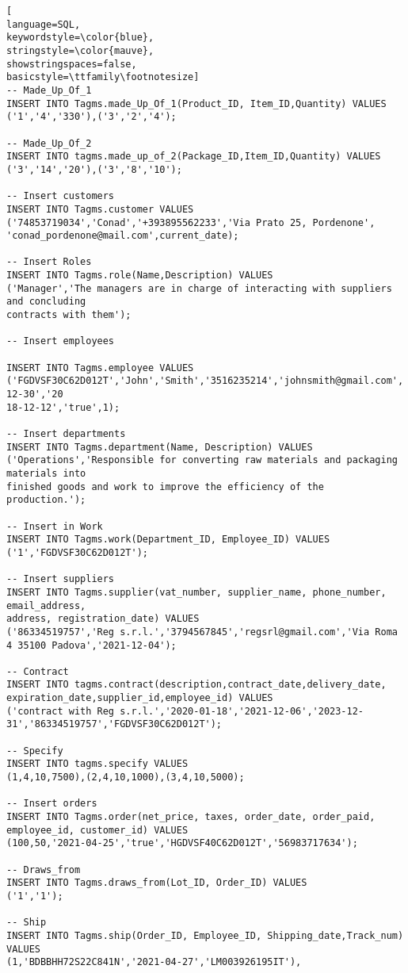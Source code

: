 \begin{lstlisting}[
language=SQL,
keywordstyle=\color{blue},
stringstyle=\color{mauve},
showstringspaces=false,
basicstyle=\ttfamily\footnotesize]
-- Made_Up_Of_1
INSERT INTO Tagms.made_Up_Of_1(Product_ID, Item_ID,Quantity) VALUES
('1','4','330'),('3','2','4');

-- Made_Up_Of_2
INSERT INTO tagms.made_up_of_2(Package_ID,Item_ID,Quantity) VALUES 
('3','14','20'),('3','8','10');

-- Insert customers
INSERT INTO Tagms.customer VALUES
('74853719034','Conad','+393895562233','Via Prato 25, Pordenone',
'conad_pordenone@mail.com',current_date);

-- Insert Roles
INSERT INTO Tagms.role(Name,Description) VALUES 
('Manager','The managers are in charge of interacting with suppliers and concluding 
contracts with them');

-- Insert employees

INSERT INTO Tagms.employee VALUES
('FGDVSF30C62D012T','John','Smith','3516235214','johnsmith@gmail.com','1995-12-30','20
18-12-12','true',1);

-- Insert departments
INSERT INTO Tagms.department(Name, Description) VALUES 
('Operations','Responsible for converting raw materials and packaging materials into 
finished goods and work to improve the efficiency of the production.');

-- Insert in Work
INSERT INTO Tagms.work(Department_ID, Employee_ID) VALUES ('1','FGDVSF30C62D012T');

-- Insert suppliers
INSERT INTO Tagms.supplier(vat_number, supplier_name, phone_number, email_address, 
address, registration_date) VALUES  
('86334519757','Reg s.r.l.','3794567845','regsrl@gmail.com','Via Roma 4 35100 Padova','2021-12-04'); 

-- Contract
INSERT INTO tagms.contract(description,contract_date,delivery_date,
expiration_date,supplier_id,employee_id) VALUES 
('contract with Reg s.r.l.','2020-01-18','2021-12-06','2023-12-31','86334519757','FGDVSF30C62D012T');

-- Specify
INSERT INTO tagms.specify VALUES
(1,4,10,7500),(2,4,10,1000),(3,4,10,5000);

-- Insert orders 
INSERT INTO Tagms.order(net_price, taxes, order_date, order_paid, employee_id, customer_id) VALUES 
(100,50,'2021-04-25','true','HGDVSF40C62D012T','56983717634');

-- Draws_from
INSERT INTO Tagms.draws_from(Lot_ID, Order_ID) VALUES 
('1','1');

-- Ship
INSERT INTO Tagms.ship(Order_ID, Employee_ID, Shipping_date,Track_num) VALUES
(1,'BDBBHH72S22C841N','2021-04-27','LM003926195IT'),


\end{lstlisting}